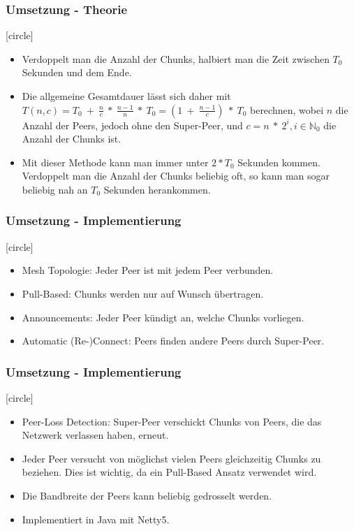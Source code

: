 \begin{frame}
  \frametitle{Umsetzung - Theorie}

  [circle]
  \begin{itemize}  
    \item Verdoppelt man die Anzahl der Chunks, halbiert man die Zeit zwischen $T_0$ Sekunden und dem Ende.
    \item Die allgemeine Gesamtdauer lässt sich daher mit $T(n, c) = T_0\:+\:\frac{n}{c}\:*\:\frac{n-1}{n}\:*\:T_0 = (1\:+\:\frac{n-1}{c})\:*\:T_0$ berechnen, wobei $n$ die Anzahl der Peers, jedoch ohne den Super-Peer, und $c = n\:*\:2^i, i \in \mathbb{N}_0$ die Anzahl der Chunks ist.

    \item Mit dieser Methode kann man immer unter $2 * T_0$ Sekunden kommen. Verdoppelt man die Anzahl der Chunks beliebig oft, so kann man sogar beliebig nah an $T_0$ Sekunden herankommen.
  \end{itemize} 

\end{frame}





\begin{frame}
  \frametitle{Umsetzung - Implementierung}

  [circle]
  \begin{itemize}  
    \item Mesh Topologie: Jeder Peer ist mit jedem Peer verbunden.
    \item Pull-Based: Chunks werden nur auf Wunsch übertragen.
    \item Announcements: Jeder Peer kündigt an, welche Chunks vorliegen.
    \item Automatic (Re-)Connect: Peers finden andere Peers durch Super-Peer.
  \end{itemize} 

\end{frame}

\begin{frame}
  \frametitle{Umsetzung - Implementierung}

  [circle]
  \begin{itemize}  
    \item Peer-Loss Detection: Super-Peer verschickt Chunks von Peers, die das Netzwerk verlassen haben, erneut.
    \item Jeder Peer versucht von möglichst vielen Peers gleichzeitig Chunks zu beziehen. Dies ist wichtig, da ein Pull-Based Ansatz verwendet wird.
    \item Die Bandbreite der Peers kann beliebig gedrosselt werden. 
    \item Implementiert in Java mit Netty5.
  \end{itemize} 

\end{frame}


